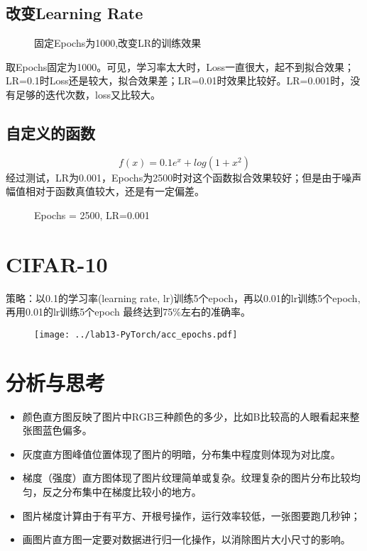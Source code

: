 \documentclass[12pt,a4paper]{article}
\begin{document}
\subsection{改变Learning Rate}
\begin{figure}

	\caption{固定Epochs为1000,改变LR的训练效果}
	\centering
\end{figure}
取Epochs固定为1000。可见，学习率太大时，Loss一直很大，起不到拟合效果；LR=0.1时Loss还是较大，拟合效果差；LR=0.01时效果比较好。LR=0.001时，没有足够的迭代次数，loss又比较大。

\subsection{自定义的函数}
$$f(x)=0.1e^x + log(1+x^2)$$
经过测试，LR为0.001，Epochs为2500时对这个函数拟合效果较好；但是由于噪声幅值相对于函数真值较大，还是有一定偏差。
\begin{figure}[H]

	\caption{Epochs = 2500, LR=0.001}
	\centering
\end{figure}

\section{CIFAR-10}
策略：以0.1的学习率(learning rate, lr)训练5个epoch，再以0.01的lr训练5个epoch,再用0.01的lr训练5个epoch
最终达到75\%左右的准确率。
\begin{figure}[H]
\texttt{[image: ../lab13-PyTorch/acc\_epochs.pdf]}
	\centering
\end{figure}

\section{分析与思考}
\begin{itemize}
\item 颜色直方图反映了图片中RGB三种颜色的多少，比如B比较高的人眼看起来整张图蓝色偏多。
\item 灰度直方图峰值位置体现了图片的明暗，分布集中程度则体现为对比度。
\item 梯度（强度）直方图体现了图片纹理简单或复杂。纹理复杂的图片分布比较均匀，反之分布集中在梯度比较小的地方。
\item 图片梯度计算由于有平方、开根号操作，运行效率较低，一张图要跑几秒钟；
\item 画图片直方图一定要对数据进行归一化操作，以消除图片大小尺寸的影响。
\end{itemize}
\end{document}
